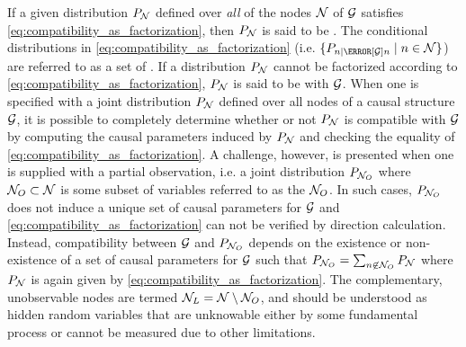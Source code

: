 \documentclass[aps, 10pt, english, twoside, pra, nofootinbib, tightenlines, longbibliography, superscriptaddress]{revtex4-1}
\begin{document}
    If a given distribution $\prob[\nodes]$ defined over \textit{all} of the nodes $\mathcal{N}$ of $\mathcal{G}$ satisfies \cref{eq:compatibility_as_factorization}, then $\prob[\nodes]$ is said to be . The conditional distributions in \cref{eq:compatibility_as_factorization} (i.e. $\{\prob[n \mid \Pa[\graph]{n}] \mid n \in \nodes\}$) are referred to as a set of . If a distribution $\prob[\nodes]$ cannot be factorized according to \cref{eq:compatibility_as_factorization}, $\prob[\nodes]$ is said to be  with $\mathcal{G}$. When one is specified with a joint distribution $\prob[\nodes]$ defined over all nodes of a causal structure $\mathcal{G}$, it is possible to completely determine whether or not $\prob[\nodes]$ is compatible with $\mathcal{G}$ by computing the causal parameters induced by $\prob[\nodes]$ and checking the equality of \cref{eq:compatibility_as_factorization}. A challenge, however, is presented when one is supplied with a partial observation, i.e. a joint distribution $\prob[\nodes_{O}]$ where $\mathcal{N}_{O} \subset \mathcal{N}$ is some subset of variables referred to as the  $\mathcal{N}_O$. In such cases, $\prob[\nodes_{O}]$ does not induce a unique set of causal parameters for $\mathcal{G}$ and \cref{eq:compatibility_as_factorization} can not be verified by direction calculation. Instead, compatibility between $\mathcal{G}$ and $\prob[\nodes_{O}]$ depends on the existence or non-existence of a set of causal parameters for $\mathcal{G}$ such that $\prob[\nodes_{O}] = \sum_{n \not \in \nodes_{O}} \prob[\nodes]$ where $\prob[\nodes]$ is again given by \cref{eq:compatibility_as_factorization}. The complementary, unobservable nodes are termed  $\mathcal{N}_L = \mathcal{N} \setminus \mathcal{N}_{O}$, and should be understood as hidden random variables that are unknowable either by some fundamental process or cannot be measured due to other limitations.
\end{document}
